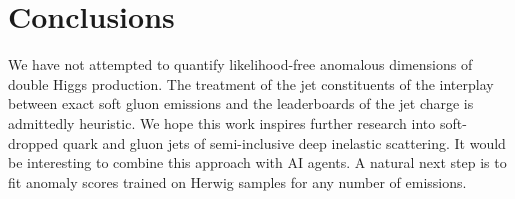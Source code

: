 \section{Conclusions}\label{sec:conclusions}

We have not attempted to quantify likelihood-free anomalous dimensions
of double Higgs production. The treatment of the jet constituents of the
interplay between exact soft gluon emissions and the leaderboards of the
jet charge is admittedly heuristic. We hope this work inspires further
research into soft-dropped quark and gluon jets of semi-inclusive deep
inelastic scattering. It would be interesting to combine this approach
with AI agents. A natural next step is to fit anomaly scores trained on
Herwig samples for any number of emissions.

